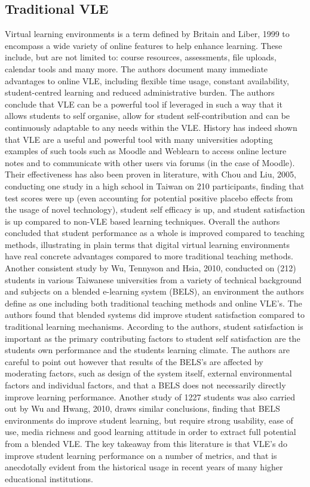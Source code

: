 \documentclass[11pt]{report}
\begin{document}
\subsection{Traditional VLE}
Virtual learning environments is a term defined by Britain and Liber, 1999 to encompass a wide variety of online features to help enhance learning. These include, but are not limited to: course resources, assessments, file uploads, calendar tools and many more. The authors document many immediate advantages to online VLE, including flexible time usage, constant availability, student-centred learning and reduced administrative burden. The authors conclude that VLE can be a powerful tool if leveraged in such a way that it allows students to self organise, allow for student self-contribution and can be continuously adaptable to any needs within the VLE. History has indeed shown that VLE are a useful and powerful tool with many universities adopting examples of such tools such as Moodle and Weblearn to access online lecture notes and to communicate with other users via forums (in the case of Moodle). Their effectiveness has also been proven in literature, with Chou and Liu, 2005, conducting one study in a high school in Taiwan on 210 participants, finding that test scores were up (even accounting for potential positive placebo effects from the usage of novel technology), student self efficacy is up, and student satisfaction is up compared to non-VLE based learning techniques. Overall the authors concluded that student performance as a whole is improved compared to teaching methods, illustrating in plain terms that digital virtual learning environments have real concrete advantages compared to more traditional teaching methods. Another consistent study by Wu, Tennyson and Hsia, 2010, conducted on (212) students in various Taiwanese universities from a variety of technical background and subjects on a blended e-learning system (BELS), an environment the authors define as one including both traditional teaching methods and online VLE's. The authors found that blended systems did improve student satisfaction compared to traditional learning mechanisms. According to the authors, student satisfaction is important as the primary contributing factors to student self satisfaction are the students own performance and the students learning climate. The authors are careful to point out however that results of the BELS's are affected by moderating factors, such as design of the system itself, external environmental factors and individual factors, and that a BELS does not necessarily directly improve learning performance. Another study of 1227 students was also carried out by Wu and Hwang, 2010, draws similar conclusions, finding that BELS environments do improve student learning, but require strong usability, ease of use, media richness and good learning attitude in order to extract full potential from a blended VLE. The key takeaway from this literature is that VLE's do improve student learning performance on a number of metrics, and that is anecdotally evident from the historical usage in recent years of many higher educational institutions.
\end{document}
